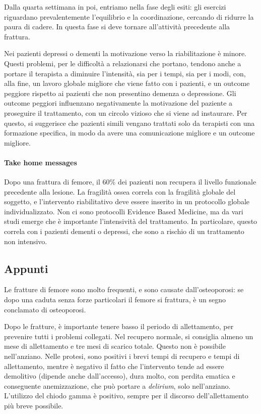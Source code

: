 Dalla quarta settimana in poi, entriamo nella fase degli esiti: gli esercizi
riguardano prevalentemente l'equilibrio e la coordinazione, cercando di ridurre
la paura di cadere. In questa fase si deve tornare all'attività precedente alla
frattura.

Nei pazienti depressi o dementi la motivazione verso la riabilitazione è minore.
Questi problemi, per le difficoltà a relazionarsi che portano, tendono anche a
portare il terapista a diminuire l'intensità, sia per i tempi, sia per i modi,
con, alla fine, un lavoro globale migliore che viene fatto con i pazienti, e un
outcome peggiore rispetto ai pazienti che non presentino demenza o depressione.
Gli outcome peggiori influenzano negativamente la motivazione del paziente a
proseguire il trattamento, con un circolo vizioso che si viene ad instaurare.
Per questo, si suggerisce che pazienti simili vengano trattati solo da terapisti
con una formazione specifica, in modo da avere una comunicazione migliore
e un outcome migliore.

\paragraph{Take home messages}
Dopo una frattura di femore, il 60\% dei pazienti non recupera il livello
funzionale precedente alla lesione. La fragilità ossea correla con la fragilità
globale del soggetto, e l'intervento riabilitativo deve essere inserito in un
protocollo globale individualizzato. Non ci sono protocolli Evidence Based
Medicine, ma da vari studi emerge che è importante l'intensività del
trattamento. In particolare, questo correla con i pazienti dementi o depressi,
che sono a rischio di un trattamento non intensivo.

\subsection{Appunti}
Le fratture di femore sono molto frequenti, e sono causate dall'osteoporosi: se 
dopo una caduta senza forze particolari il femore si frattura, è un segno 
conclamato di osteoporosi.

Dopo le fratture, è importante tenere basso il periodo di allettamento, per 
prevenire tutti i problemi collegati. Nel recupero normale, si consiglia almeno 
un mese di allettamento e tre mesi di scarico totale. Questo non è possibile 
nell'anziano. Nelle protesi, sono positivi i brevi tempi di recupero e tempi di 
allettamento, mentre è negativo il fatto che l'intervento tende ad essere 
demolitivo (dipende anche dall'accesso), dura molto, con perdita ematica e 
conseguente anemizzazione, che può portare a \textit{delirium}, solo 
nell'anziano. L'utilizzo del chiodo gamma è positivo, sempre per il discorso 
dell'allettamento più breve possibile.


